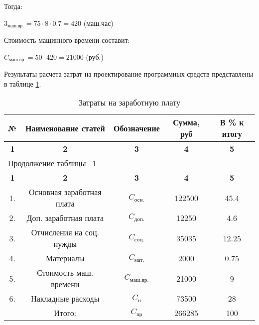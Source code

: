 Тогда:
\begin{center}
${3_{\mbox{маш.вр.}} = 75 \cdot 8 \cdot 0.7 = 420}$ (маш.час)
\end{center}

Стоимость машинного времени составит:
\begin{center}
${C_{\mbox{маш.вр.}} = 50 \cdot 420 = 21000}$ (руб.)
\end{center}

Результаты расчета затрат на проектирование программных средств представлены в таблице \ref{tab:eco_smeta}.

\begin{center}
\begin{longtable}{|c|c|c|c|c|}
\caption{Затраты на заработную плату} \label{tab:eco_smeta} \\ \hline
\multicolumn{1}{|c|}{\textbf{№}} & \multicolumn{1}{c|}{\textbf{Наименование статей}} & 
\multicolumn{1}{c|}{\textbf{Обозначение}} &   \multicolumn{1}{c|}{\textbf{Сумма, руб}} & 
\multicolumn{1}{c|}{\textbf{В \% к итогу}} \\ \hline

\multicolumn{1}{|c|}{\textbf{1}} &   \multicolumn{1}{c|}{\textbf{2}} & 
\multicolumn{1}{c|}{\textbf{3}} &   \multicolumn{1}{c|}{\textbf{4}} & 
\multicolumn{1}{c|}{\textbf{5}} \\ \hline
\endfirsthead

\multicolumn{5}{|l|}{{Продолжение таблицы ~\ref{tab:eco_smeta}}} \\ %
\hline
\multicolumn{1}{|c|}{\textbf{1}} &   \multicolumn{1}{c|}{\textbf{2}} & 
\multicolumn{1}{c|}{\textbf{3}} &   \multicolumn{1}{c|}{\textbf{4}} & 
\multicolumn{1}{c|}{\textbf{5}} \\ \hline
\endhead

\endfoot

\hline
\endlastfoot

1. & Основная заработная плата & ${C_{\mbox{осн.}}}$ & 122500 & 45.4 \\ \hline
2. & Доп. заработная плата & ${C_{\mbox{доп.}}}$ & 12250 & 4.6 \\ \hline
3. & Отчисления на соц. нужды & ${C_{\mbox{соц.}}}$ & 35035 & 12.25 \\ \hline
4. & Материалы & ${C_{\mbox{мат.}}}$ & 2000 & 0.75 \\ \hline
5. & Стоимость маш. времени & ${C_{\mbox{маш.вр.}}}$ & 21000 & 9 \\ \hline
6. & Накладные расходы & ${C_{\mbox{н}}}$ & 73500 & 28 \\ \hline
   & Итого: & ${C_{\mbox{пр}}}$ & 266285 & 100 \\ 

\hline

\end{longtable}
\end{center}

